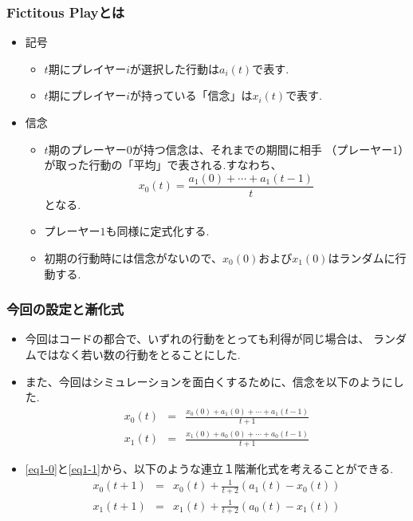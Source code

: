 \documentclass[dvipdfmx,fleqn]{beamer}
\begin{document}
\begin{frame}
\frametitle{Fictitous Playとは}
\begin{itemize}\setlength{\parskip}{0.5em}

\item
記号

	\begin{itemize}\setlength{\parskip}{0.5em}
	\item $t$期にプレイヤー$i$が選択した行動は$a_i(t)$で表す.
	
	\item $t$期にプレイヤー$i$が持っている「信念」は$x_i(t)$で表す.
	
	\end{itemize}

\item
信念

	\begin{itemize}\setlength{\parskip}{0.5em}
	\item
	$t$期のプレーヤー$0$が持つ信念は、それまでの期間に相手
	（プレーヤー$1$）が取った行動の「平均」で表される.すなわち、
	\begin{equation}
	x_0(t) = \frac{a_1(0)+\cdots+a_1(t-1)}{t} \label{eq0}
	\end{equation}
	となる.
	
	\item
	プレーヤー$1$も同様に定式化する.
	
	\item
	初期の行動時には信念がないので、$x_0(0)$および$x_1(0)$はランダムに行動する.
	\end{itemize}

\end{itemize}
\end{frame}

\begin{frame}
\frametitle{今回の設定と漸化式}
\begin{itemize}\setlength{\parskip}{0.5em}

\item
今回はコードの都合で、いずれの行動をとっても利得が同じ場合は、
ランダムではなく若い数の行動をとることにした.

\item
また、今回はシミュレーションを面白くするために、信念を以下のようにした.
\begin{eqnarray} 
x_0(t) &=& \frac{x_0(0)+a_1(0)+\cdots+a_1(t-1)}{t+1} \label{eq1-0} \\
x_1(t) &=& \frac{x_1(0)+a_0(0)+\cdots+a_0(t-1)}{t+1} \label{eq1-1}
\end{eqnarray}

\item
\eqref{eq1-0}と\eqref{eq1-1}から、以下のような連立１階漸化式を考えることができる.
\begin{eqnarray} 
x_0(t+1) &=& x_0(t)+\frac{1}{t+2}(a_1(t)-x_0(t)) \label{eq2-0}\\
x_1(t+1) &=& x_1(t)+\frac{1}{t+2}(a_0(t)-x_1(t)) \label{eq2-1}
\end{eqnarray}


\end{itemize}
\end{frame}
\end{document}
